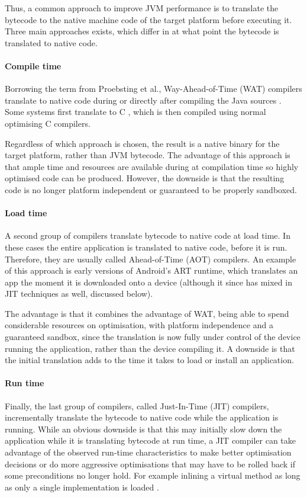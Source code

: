 Thus, a common approach to improve JVM performance is to translate the bytecode to the native machine code of the target platform before executing it. Three main approaches exists, which differ in at what point the bytecode is translated to native code.

\paragraph{Compile time}
Borrowing the term from Proebsting et al., Way-Ahead-of-Time (WAT) compilers translate to native code during or directly after compiling the Java sources \cite{Proebsting:1997wg}. Some systems first translate to C \cite{Dean:1996wb}, which is then compiled using normal optimising C compilers. 

Regardless of which approach is chosen, the result is a native binary for the target platform, rather than JVM bytecode. The advantage of this approach is that ample time and resources are available during at compilation time so highly optimised code can be produced. However, the downside is that the resulting code is no longer platform independent or guaranteed to be properly sandboxed.

\paragraph{Load time}
A second group of compilers translate bytecode to native code at load time. In these cases the entire application is translated to native code, before it is run. Therefore, they are usually called Ahead-of-Time (AOT) compilers. An example of this approach is early versions of Android's ART runtime, which translates an app the moment it is downloaded onto a device (although it since has mixed in JIT techniques as well, discussed below).

The advantage is that it combines the advantage of WAT, being able to spend considerable resources on optimisation, with platform independence and a guaranteed sandbox, since the translation is now fully under control of the device running the application, rather than the device compiling it. A downside is that the initial translation adds to the time it takes to load or install an application.

\paragraph{Run time}
Finally, the last group of compilers, called Just-In-Time (JIT) compilers, incrementally translate the bytecode to native code while the application is running. While an obvious downside is that this may initially slow down the application while it is translating bytecode at run time, a JIT compiler can take advantage of the observed run-time characteristics to make better optimisation decisions or do more aggressive optimisations that may have to be rolled back if some preconditions no longer hold. For example inlining a virtual method as long as only a single implementation is loaded \cite{Ishizaki:2000vv}.







